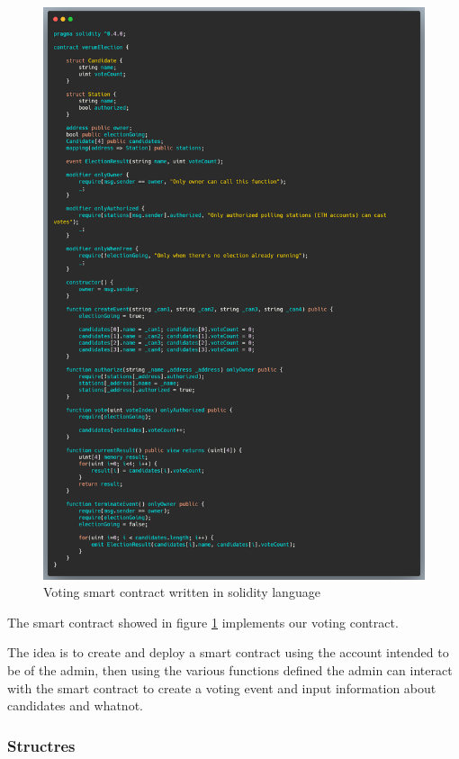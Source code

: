 \begin{figure}[H]
	\centering
		\includegraphics[width=12cm]{images/chapter3/smart-contract.png}
		\caption{{\footnotesize Voting smart contract written in solidity language}}
		\label{smart_contract}
\end{figure}

The smart contract showed in figure \ref{smart_contract} implements our voting contract.

The idea is to create and deploy a smart contract using the account intended to be of the admin, then using the various functions defined the admin can interact with the smart contract to create a voting event and input information about candidates and whatnot.

\subsubsection{Structres}

